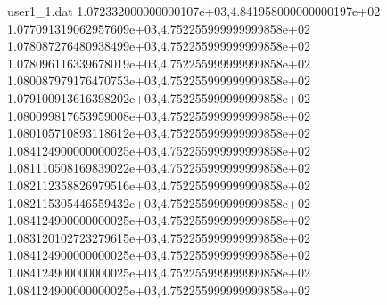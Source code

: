 \begin{filecontents}{user1_1.dat}
1.072332000000000107e+03,4.841958000000000197e+02
1.077091319062957609e+03,4.752255999999999858e+02
1.078087276480938499e+03,4.752255999999999858e+02
1.078096116339678019e+03,4.752255999999999858e+02
1.080087979176470753e+03,4.752255999999999858e+02
1.079100913616398202e+03,4.752255999999999858e+02
1.080099817653959008e+03,4.752255999999999858e+02
1.080105710893118612e+03,4.752255999999999858e+02
1.084124900000000025e+03,4.752255999999999858e+02
1.081110508169839022e+03,4.752255999999999858e+02
1.082112358826979516e+03,4.752255999999999858e+02
1.082115305446559432e+03,4.752255999999999858e+02
1.084124900000000025e+03,4.752255999999999858e+02
1.083120102723279615e+03,4.752255999999999858e+02
1.084124900000000025e+03,4.752255999999999858e+02
1.084124900000000025e+03,4.752255999999999858e+02
1.084124900000000025e+03,4.752255999999999858e+02
\end{filecontents}